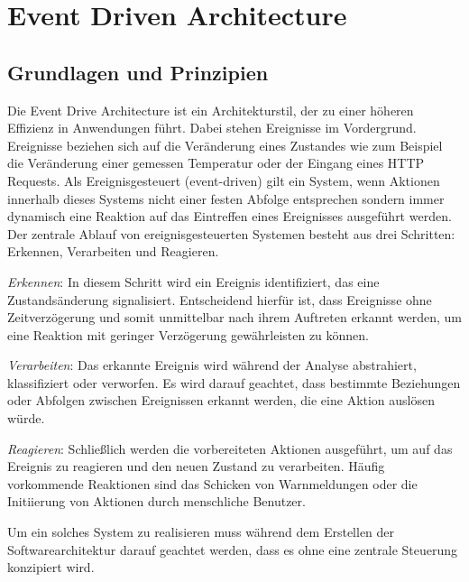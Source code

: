 \documentclass[a4paper,12pt]{article}
\let\stdsection\section
\renewcommand\section{\newpage\stdsection}
\begin{document}
\section{Event Driven Architecture}
\subsection{Grundlagen und Prinzipien}
Die Event Drive Architecture ist ein Architekturstil, der zu einer höheren Effizienz in Anwendungen führt. Dabei stehen Ereignisse im Vordergrund. Ereignisse beziehen sich auf die Veränderung eines Zustandes wie zum Beispiel die Veränderung einer gemessen Temperatur oder der Eingang eines HTTP Requests.
Als Ereignisgesteuert (event-driven) gilt ein System, wenn Aktionen innerhalb dieses Systems nicht einer festen Abfolge entsprechen sondern immer dynamisch eine Reaktion auf das Eintreffen eines Ereignisses ausgeführt werden.
Der zentrale Ablauf von ereignisgesteuerten Systemen besteht aus drei Schritten: Erkennen, Verarbeiten und Reagieren. \cite[S. 48f]{Bruns2010}

\textit{Erkennen}: In diesem Schritt wird ein Ereignis identifiziert, das eine Zustandsänderung signalisiert. Entscheidend hierfür ist, dass Ereignisse ohne Zeitverzögerung und somit unmittelbar nach ihrem Auftreten erkannt werden, um eine Reaktion mit geringer Verzögerung gewährleisten zu können.

\textit{Verarbeiten}: Das erkannte Ereignis wird während der Analyse abstrahiert, klassifiziert oder verworfen. Es wird darauf geachtet, dass bestimmte Beziehungen oder Abfolgen zwischen Ereignissen erkannt werden, die eine Aktion auslösen würde.

\textit{Reagieren}: Schließlich werden die vorbereiteten Aktionen ausgeführt, um auf das Ereignis zu reagieren und den neuen Zustand zu verarbeiten. Häufig vorkommende Reaktionen sind das Schicken von Warnmeldungen oder die Initiierung von Aktionen durch menschliche Benutzer. 

Um ein solches System zu realisieren muss während dem Erstellen der Softwarearchitektur darauf geachtet werden, dass es ohne eine zentrale Steuerung konzipiert wird. \cite[S. 50]{Bruns2010}
\end{document}
